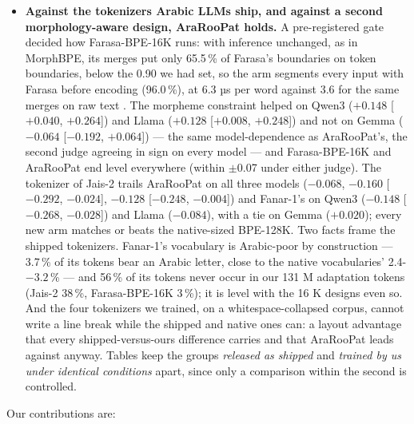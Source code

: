 \begin{itemize}
  an MMLU gap of $-0.026$ to $-0.039$ remains. A judged answer is not scored through option letters --- the measurement
  argument above, seen in our own numbers.
  \item \textbf{Against the tokenizers Arabic LLMs ship, and against a second morphology-aware design, AraRooPat holds.}
  A pre-registered gate decided how Farasa-BPE-16K runs: with inference unchanged, as in MorphBPE, its merges put only
  65.5\,\% of Farasa's boundaries on token boundaries, below the 0.90 we had set, so the arm segments every input with
  Farasa before encoding (96.0\,\%), at 6.3 µs per word against 3.6 for the same merges on raw text \citep[how a
  vocabulary is applied at inference is a choice of its own;][]{uzan-2024-greed}. The morpheme constraint helped on
  Qwen3 ($+0.148$ [$+0.040$, $+0.264$]) and Llama ($+0.128$ [$+0.008$, $+0.248$]) and not on Gemma ($-0.064$ [$-0.192$,
  $+0.064$]) --- the same model-dependence as AraRooPat's, the second judge agreeing in sign on every model --- and
  Farasa-BPE-16K and AraRooPat end level everywhere (within $\pm$0.07 under either judge). The tokenizer of Jais-2
  trails AraRooPat on all three models ($-0.068$, $-0.160$ [$-0.292$, $-0.024$], $-0.128$ [$-0.248$, $-0.004$]) and
  Fanar-1's on Qwen3 ($-0.148$ [$-0.268$, $-0.028$]) and Llama ($-0.084$), with a tie on Gemma ($+0.020$); every new arm
  matches or beats the native-sized BPE-128K. Two facts frame the shipped tokenizers. Fanar-1's vocabulary is
  Arabic-poor by construction --- 3.7\,\% of its tokens bear an Arabic letter, close to the native vocabularies'
  2.4-$-3.2$\,\% --- and 56\,\% of its tokens never occur in our 131 M adaptation tokens (Jais-2 38\,\%, Farasa-BPE-16K
  3\,\%); it is level with the 16 K designs even so. And the four tokenizers we trained, on a whitespace-collapsed
  corpus, cannot write a line break while the shipped and native ones can: a layout advantage that every
  shipped-versus-ours difference carries and that AraRooPat leads against anyway. Tables keep the groups
  \textit{released as shipped} and \textit{trained by us under identical conditions} apart, since only a comparison
  within the second is controlled.
\end{itemize}

Our contributions are:

